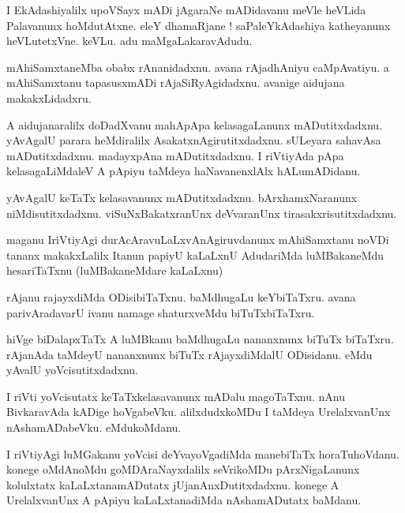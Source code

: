 \documentclass{article}
\begin{document}
\begin{mn}%
I EkAdashiyalilx upoVSayx mADi jAgaraNe mADidavanu meVle heVLida Palavanunx hoMdutAtxne. eleY 
dhamaRjane ! saPaleYkAdashiya katheyanunx heVLutetxVne. keVLu. adu maMgaLakaravAdudu.
\end{mn}

\begin{mn}%
mAhiSamxtaneMba obabx rAnanidadxnu. avana rAjadhAniyu caMpAvatiyu. a mAhiSamxtanu tapasusxmADi 
rAjaSiRyAgidadxnu. avanige aidujana makakxLidadxru.
\end{mn}

\begin{mn}%
A aidujanaralilx doDadXvanu mahApApa kelasagaLanunx mADutitxdadxnu. yAvAgalU parara heMdiralilx 
AsakatxnAgirutitxdadxnu. sULeyara sahavAsa mADutitxdadxnu. madayxpAna mADutitxdadxnu. I riVtiyAda 
pApa kelasagaLiMdaleV A pApiyu taMdeya haNavanenxlAlx hALumADidanu.
\end{mn}

\begin{mn}%
yAvAgalU keTaTx kelasavanunx mADutitxdadxnu. bArxhamxNaranunx niMdisutitxdadxnu. viSuNxBakatxranUnx 
deVvaranUnx tirasakxrisutitxdadxnu.
\end{mn}

\begin{mn}%
maganu IriVtiyAgi durAcAravuLaLxvAnAgiruvdanunx mAhiSamxtanu noVDi tananx makakxLalilx Itanun 
papiyU kaLaLxnU AdudariMda luMBakaneMdu hesariTaTxnu (luMBakaneMdare kaLaLxnu)
\end{mn}

\begin{mn}%
rAjanu rajayxdiMda ODisibiTaTxnu. baMdhugaLu keYbiTaTxru. avana parivAradavarU ivanu namage 
shaturxveMdu biTuTxbiTaTxru.
\end{mn}

\begin{mn}%
hiVge biDalapxTaTx A luMBkanu baMdhugaLu nananxnunx biTuTx biTaTxru. rAjanAda taMdeyU nananxnunx 
biTuTx rAjayxdiMdalU ODisidanu. eMdu yAvalU yoVcisutitxdadxnu.
\end{mn}

\begin{mn}%
I riVti yoVcisutatx keTaTxkelasavanunx mADalu magoTaTxnu. nAnu BivkaravAda kADige hoVgabeVku. 
alilxdudxkoMDu I taMdeya UrelalxvanUnx nAshamADabeVku. eMdukoMdanu.
\end{mn}

\begin{mn}%
I riVtiyAgi luMGakanu yoVcisi deYvayoVgadiMda manebiTaTx horaTuhoVdanu. konege oMdAnoMdu 
goMDAraNayxdalilx seVrikoMDu pArxNigaLanunx kolulxtatx kaLaLxtanamADutatx jUjanAnxDutitxdadxnu. 
konege A UrelalxvanUnx A pApiyu kaLaLxtanadiMda nAshamADutatx baMdanu. 
\end{mn}
\end{document}
